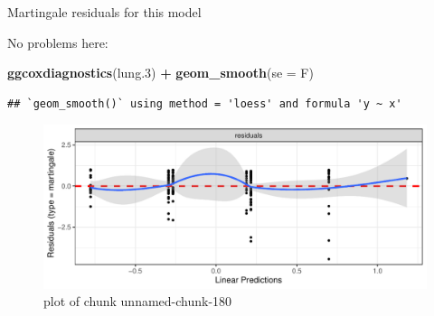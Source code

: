 \documentclass[ignorenonframetext,]{beamer}
\newenvironment{Shaded}{\begin{snugshade}}{\end{snugshade}}
\newcommand{\DataTypeTok}[1]{\textcolor[rgb]{0.13,0.29,0.53}{#1}}
\newcommand{\FloatTok}[1]{\textcolor[rgb]{0.00,0.00,0.81}{#1}}
\newcommand{\KeywordTok}[1]{\textcolor[rgb]{0.13,0.29,0.53}{\textbf{#1}}}
\newcommand{\NormalTok}[1]{#1}
\newcommand{\OperatorTok}[1]{\textcolor[rgb]{0.81,0.36,0.00}{\textbf{#1}}}
\newcommand{\StringTok}[1]{\textcolor[rgb]{0.31,0.60,0.02}{#1}}
\begin{document}
\begin{frame}[fragile]{Martingale residuals for this model}
\protect\hypertarget{martingale-residuals-for-this-model}{}

No problems here:

\begin{Shaded}
\begin{Highlighting}[]
\KeywordTok{ggcoxdiagnostics}\NormalTok{(lung}\FloatTok{.3}\NormalTok{) }\OperatorTok{+}\StringTok{ }\KeywordTok{geom_smooth}\NormalTok{(}\DataTypeTok{se =}\NormalTok{ F)}
\end{Highlighting}
\end{Shaded}

\begin{verbatim}
## `geom_smooth()` using method = 'loess' and formula 'y ~ x'
\end{verbatim}

\begin{figure}
\centering
\includegraphics{figure/unnamed-chunk-180-1.pdf}
\caption{plot of chunk unnamed-chunk-180}
\end{figure}

\end{frame}
\end{document}
